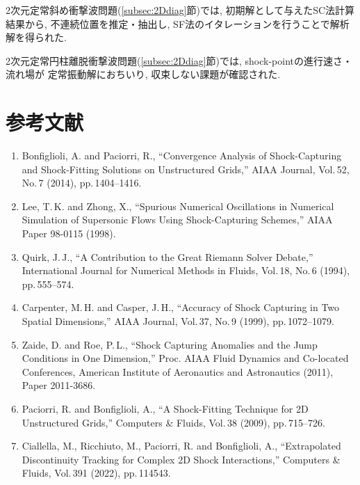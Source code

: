 \documentclass[a4j]{jarticle}
\begin{document}
2次元定常斜め衝撃波問題(\ref{subsec:2Ddiag}節)では, 初期解として与えたSC法計算結果から,
不連続位置を推定・抽出し, SF法のイタレーションを行うことで解析解を得られた.

2次元定常円柱離脱衝撃波問題(\ref{subsec:2Ddiag}節)では, shock-pointの進行速さ・流れ場が 
定常振動解におちいり, 収束しない課題が確認された.

\section*{参考文献}

\begin{enumerate}
  \item Bonfiglioli, A. and Paciorri, R., ``Convergence Analysis of Shock-Capturing and Shock-Fitting Solutions on Unstructured Grids,'' 
  AIAA Journal, Vol.\,52, No.\,7 (2014), pp.\,1404–1416.  
  \label{ref:scsf_conv}

  \item Lee, T.\,K. and Zhong, X., ``Spurious Numerical Oscillations in Numerical Simulation of Supersonic Flows Using Shock-Capturing Schemes,'' 
  AIAA Paper 98-0115 (1998).  
  \label{ref:osci}

  \item Quirk, J.\,J., ``A Contribution to the Great Riemann Solver Debate,'' 
  International Journal for Numerical Methods in Fluids, Vol.\,18, No.\,6 (1994), pp.\,555–574.
  \label{ref:plague}

  \item Carpenter, M.\,H. and Casper, J.\,H., ``Accuracy of Shock Capturing in Two Spatial Dimensions,'' 
  AIAA Journal, Vol.\,37, No.\,9 (1999), pp.\,1072–1079.
  \label{ref:posi1}

  \item Zaide, D. and Roe, P.\,L., ``Shock Capturing Anomalies and the Jump Conditions in One Dimension,'' 
  Proc. AIAA Fluid Dynamics and Co-located Conferences, American Institute of Aeronautics and Astronautics (2011), Paper 2011-3686.  
  \label{ref:posi2}

  \item Paciorri, R. and Bonfiglioli, A., ``A Shock-Fitting Technique for 2D Unstructured Grids,'' 
  Computers \& Fluids, Vol.\,38 (2009), pp.\,715--726.
  \label{ref:effdomain}

  \item Ciallella, M., Ricchiuto, M., Paciorri, R. and Bonfiglioli, A., ``Extrapolated Discontinuity Tracking for Complex 2D Shock Interactions,'' 
  Computers \& Fluids, Vol.\,391 (2022), pp.\,114543.
  \label{ref:eDIT}


\end{enumerate}
\end{document}
